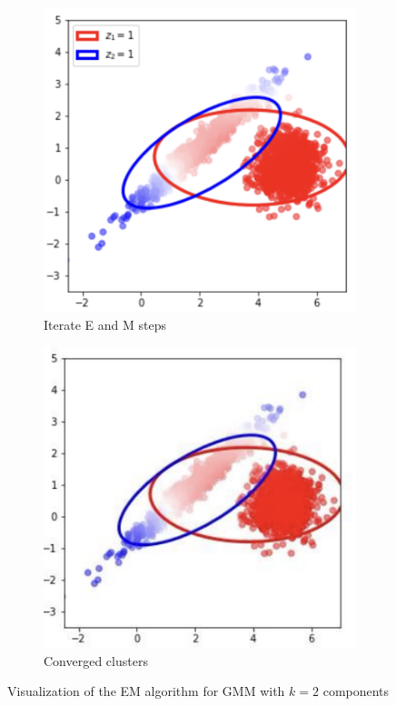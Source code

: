 \documentclass[11pt]{article}
\begin{document}
\begin{figure}[!ht]
	\vspace{0.2em}

	\begin{subfigure}[t]{0.3\textwidth}
		\centering
		\includegraphics[width=\textwidth]{../imgs/gmm_p5.png}
		\caption*{\small Iterate E and M steps}
	\end{subfigure}
	\hspace{0.15\textwidth}
	\begin{subfigure}[t]{0.3\textwidth}
		\centering
		\includegraphics[width=\textwidth]{../imgs/gmm_p6.png}
    \caption*{\small Converged clusters}
	\end{subfigure}

	\caption{Visualization of the EM algorithm for GMM with $k = 2$ components}
\end{figure}
\end{document}
